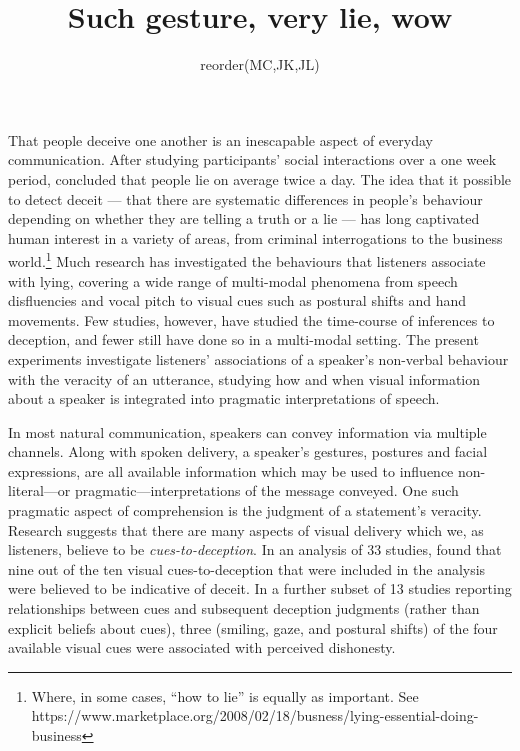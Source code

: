 \documentclass[a4paper,man,natbib]{apa6}
\title{Such gesture, very lie, wow}
\author{reorder(MC,JK,JL)}
\affiliation{Psychology, PPLS, University of Edinburgh}
\newcommand*{\term}[1]{\emph{#1}} %
\begin{document}
\maketitle
\linenumbers
\noindent
That people deceive one another is an inescapable aspect of everyday communication.
After studying participants' social interactions over a one week period, \citet{DePaulo1996} concluded that people lie on average twice a day.
The idea that it possible to detect deceit --- that there are systematic differences in people's behaviour depending on whether they are telling a truth or a lie --- has long captivated human interest in a variety of areas, from criminal interrogations to the business world.\footnote{Where, in some cases, ``how to lie'' is equally as important. See https://www.marketplace.org/2008/02/18/busness/lying-essential-doing-business}
Much research has investigated the behaviours that listeners associate with lying, covering a wide range of multi-modal phenomena from speech disfluencies and vocal pitch to visual cues such as postural shifts and hand movements.
Few studies, however, have studied the time-course of inferences to deception, and fewer still have done so in a multi-modal setting.
The present experiments investigate listeners' associations of a speaker's non-verbal behaviour with the veracity of an utterance, studying how and when visual information about a speaker is integrated into pragmatic interpretations of speech.

In most natural communication, speakers can convey information via multiple channels.
Along with spoken delivery, a speaker's gestures, postures and facial expressions, are all available information which may be used to influence non-literal---or pragmatic---interpretations of the message conveyed.
One such pragmatic aspect of comprehension is the judgment of a statement's veracity.
Research suggests that there are many aspects of visual delivery which we, as listeners, believe to be \term{cues-to-deception}.
In an analysis of 33 studies, \citet{Zuckerman1981} found that nine out of the ten visual cues-to-deception that were included in the analysis were believed to be indicative of deceit. 
In a further subset of 13 studies reporting relationships between cues and subsequent deception judgments (rather than explicit beliefs about cues), three (smiling, gaze, and postural shifts) of the four available visual cues were associated with perceived dishonesty.
\end{document}

